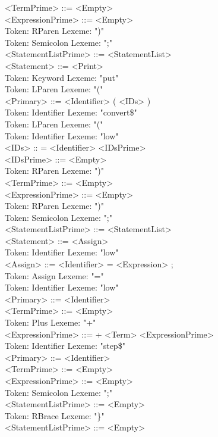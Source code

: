 \documentclass[11pt]{article}
\begin{document}
        <TermPrime> ::= <Empty> \\
        <ExpressionPrime> ::= <Empty> \\
Token: RParen    Lexeme: ")" \\
Token: Semicolon         Lexeme: ";" \\
        <StatementListPrime> ::= <StatementList> \\
        <Statement> ::= <Print> \\
Token: Keyword   Lexeme: "put" \\
Token: LParen    Lexeme: "(" \\
        <Primary> ::= <Identifier> ( <IDs> ) \\
Token: Identifier        Lexeme: "convert\$" \\
Token: LParen    Lexeme: "(" \\
Token: Identifier        Lexeme: "low" \\
        <IDs> :: = <Identifier> <IDsPrime> \\
        <IDsPrime> ::= <Empty> \\
Token: RParen    Lexeme: ")" \\
        <TermPrime> ::= <Empty> \\
        <ExpressionPrime> ::= <Empty> \\
Token: RParen    Lexeme: ")" \\
Token: Semicolon         Lexeme: ";" \\
        <StatementListPrime> ::= <StatementList> \\
        <Statement> ::= <Assign> \\
Token: Identifier        Lexeme: "low" \\
        <Assign> ::= <Identifier> = <Expression> ; \\
Token: Assign    Lexeme: "=" \\
Token: Identifier        Lexeme: "low" \\
        <Primary> ::= <Identifier> \\
        <TermPrime> ::= <Empty> \\
Token: Plus      Lexeme: "+" \\
        <ExpressionPrime> ::= + <Term> <ExpressionPrime> \\
Token: Identifier        Lexeme: "step\$" \\
        <Primary> ::= <Identifier> \\
        <TermPrime> ::= <Empty> \\
        <ExpressionPrime> ::= <Empty> \\
Token: Semicolon         Lexeme: ";" \\
        <StatementListPrime> ::= <Empty> \\
Token: RBrace    Lexeme: "\}" \\
        <StatementListPrime> ::= <Empty> \\
\end{document}
